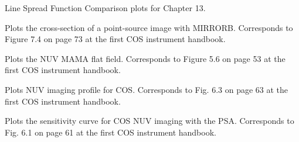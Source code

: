 \documentclass[letterpaper,10pt,english]{sphinxmanual}
\begin{document}
\begin{fulllineitems}

\begin{fulllineitems}
\label{SamPy.plot.COSIHB:SamPy.plot.COSIHB.plotting.Plotting.LSFcomparison}
Line Spread Function Comparison plots for Chapter 13.

\end{fulllineitems}



\begin{fulllineitems}
\label{SamPy.plot.COSIHB:SamPy.plot.COSIHB.plotting.Plotting.MIRRORB}
Plots the cross-section of a point-source image with MIRRORB.
Corresponds to Figure 7.4 on page 73 at the first COS instrument handbook.

\end{fulllineitems}



\begin{fulllineitems}
\label{SamPy.plot.COSIHB:SamPy.plot.COSIHB.plotting.Plotting.NUVFlatField}
Plots the NUV MAMA flat field.
Corresponds to Figure 5.6 on page 53 at the first COS instrument handbook.

\end{fulllineitems}



\begin{fulllineitems}
\label{SamPy.plot.COSIHB:SamPy.plot.COSIHB.plotting.Plotting.NUVImageProfile}
Plots NUV imaging profile for COS.
Corresponds to Fig. 6.3 on page 63 at the first COS instrument handbook.

\end{fulllineitems}



\begin{fulllineitems}
\label{SamPy.plot.COSIHB:SamPy.plot.COSIHB.plotting.Plotting.NUVPSAImagingSensitivity}
Plots the sensitivity curve for COS NUV imaging with the PSA.
Corresponds to Fig. 6.1 on page 61 at the first COS instrument handbook.


\end{fulllineitems}
\end{fulllineitems}
\end{document}
